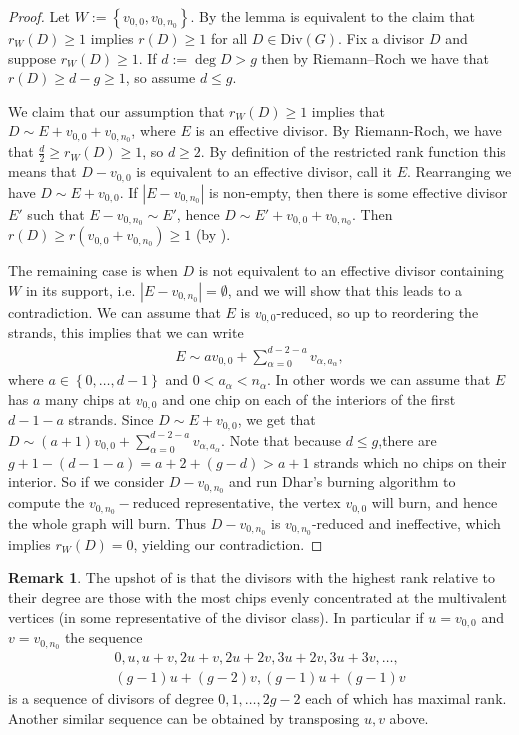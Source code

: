 \documentclass[11pt]{article}
\theoremstyle{definition}
\newtheorem{rema}[theo]{Remark}
\numberwithin{equation}{section}
\newcommand{\opdiv}[1]{\mathrm{Div}\left({#1}\right)}
\newcommand{\set}[1]{\left\{{#1}\right\}}
\begin{document}
\begin{proof}
    Let $W:=\set{v_{0,0},v_{0,n_0}}$. By \cite[Proposition 3.1]{RDS} the lemma is equivalent to the claim that $r_W(D) \geq 1$ implies $r(D)\geq 1$ for all $D \in \opdiv{G}$. Fix a divisor $D$ and suppose $r_W(D) \geq 1$. If $d:=\deg D >g$ then by Riemann--Roch we have that $r(D) \geq d-g \geq 1$, so assume $d\leq g$. 
    
    We claim that our assumption that $r_W(D)\geq 1$ implies that $D \sim E + v_{0,0} + v_{0,n_0}$, where $E$ is an effective divisor. By Riemann-Roch, we have that $\frac{d}{2} \geq r_W(D) \geq 1$, so $d\geq 2$. By definition of the restricted rank function this means that $D-v_{0,0}$ is equivalent to an effective divisor, call it $E$. Rearranging we have $D \sim E + v_{0,0}$. If $|E-v_{0,n_0}|$ is non-empty, then there is some effective divisor $E'$ such that $E-v_{0,n_0} \sim E'$, hence $D \sim E' + v_{0,0}+v_{0,n_0}$. Then $r(D)\geq r(v_{0,0} + v_{0,n_0}) \geq 1$ (by ). 
    
    The remaining case is when $D$ is not equivalent to an effective divisor containing $W$ in its support, i.e. $|E-v_{0,n_0}| = \emptyset$, and we will show that this leads to a contradiction. We can assume that $E$ is $v_{0,0}$-reduced, so up to reordering the strands, this implies that we can write
    \begin{align*}
        E \sim av_{0,0} + \sum_{\alpha = 0}^{d-2-a}v_{\alpha,a_\alpha},
    \end{align*}
    where $a \in \set{0,\dots,d-1}$ and $0<a_\alpha<n_\alpha$. In other words we can assume that $E$ has $a$ many chips at $v_{0,0}$ and one chip on each of the interiors of the first $d-1-a$ strands. Since $D \sim E+v_{0,0}$, we get that $D \sim (a+1)v_{0,0} + \sum_{\alpha = 0}^{d-2-a}v_{\alpha,a_\alpha}$. Note that because $d\leq g$,there are $g+1-(d-1-a) = a+2 + (g-d) > a+1$ strands which no chips on their interior. So if we consider $D-v_{0,n_0}$ and run Dhar's burning algorithm to compute the $v_{0,n_0}-$reduced representative, the vertex $v_{0,0}$ will burn, and hence the whole graph will burn. Thus $D- v_{0,n_0}$ is $v_{0,n_0}$-reduced and ineffective, which implies $r_{W}(D)  = 0$, yielding our contradiction.
\end{proof}

\begin{rema}
    The upshot of  is that the divisors with the highest rank relative to their degree are those with the most chips evenly concentrated at the multivalent vertices (in some representative of the divisor class). In particular if $u = v_{0,0}$ and $v = v_{0,n_0}$ the sequence
    \begin{align*}
        0,u,u+v,2u+v,2u+2v,3u+2v,3u+3v,\dots,\\(g-1)u+(g-2)v,(g-1)u+(g-1)v
    \end{align*}
    is a sequence of divisors of degree $0,1,\dots, 2g-2$ each of which has maximal rank. Another similar sequence can be obtained by transposing $u,v$ above.
\end{rema}
\end{document}
